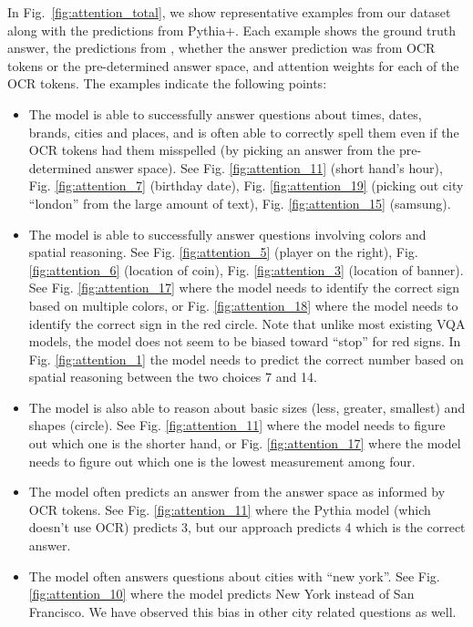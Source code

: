 \documentclass[10pt,twocolumn,letterpaper]{article}
\begin{document}
In Fig.~\ref{fig:attention_total}, we show representative examples from our \datasetName dataset along with the predictions from Pythia+\approachNameShort.
Each example shows the ground truth answer, the predictions from \approachNameShort, whether the answer prediction was from OCR tokens or the pre-determined answer space, and attention weights for each of the OCR tokens. 
The examples indicate the following points:
\begin{itemize}
    \item The model is able to successfully answer questions about times, dates, brands, cities and places, and is often able to correctly spell them even if the OCR tokens had them misspelled (by picking an answer from the pre-determined answer space).
    See Fig. \ref{fig:attention_11} (short hand's hour), Fig. \ref{fig:attention_7} (birthday date),
    Fig. \ref{fig:attention_19} (picking out city ``london'' from the large amount of text), Fig. \ref{fig:attention_15} (samsung).
    \item The model is able to successfully answer questions involving colors and spatial reasoning.
    See Fig. \ref{fig:attention_5} (player on the right), Fig. \ref{fig:attention_6} (location of coin), Fig. \ref{fig:attention_3} (location of banner).
    See Fig. \ref{fig:attention_17} where the model needs to identify the correct sign based on multiple colors, or Fig. \ref{fig:attention_18} where the model needs to identify the correct sign in the red circle. Note that unlike most existing VQA models, the model does not seem to be biased toward ``stop'' for red signs. In Fig. \ref{fig:attention_1} the model needs to predict the correct number based on spatial reasoning between the two choices 7 and 14. 
    \item The model is also able to reason about basic sizes (less, greater, smallest) and shapes (circle). 
    See Fig. \ref{fig:attention_11} where the model needs to figure out which one is the shorter hand, or Fig. \ref{fig:attention_17} where the model needs to figure out which one is the lowest measurement among four.
    \item The model often predicts an answer from the answer space as informed by OCR tokens. See Fig. \ref{fig:attention_11} where the Pythia model (which doesn't use OCR) predicts 3, but our approach predicts 4 which is the correct answer. 
    \item The model often answers questions about cities with ``new york''. See Fig. \ref{fig:attention_10} where the model predicts New York instead of San Francisco. We have observed this bias in other city related questions as well.

\end{itemize}
\end{document}
